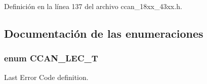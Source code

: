 Definición en la línea 137 del archivo ccan\+\_\+18xx\+\_\+43xx.\+h.



\subsection{Documentación de las enumeraciones}
\subsubsection[{\texorpdfstring{C\+C\+A\+N\+\_\+\+L\+E\+C\+\_\+T}{CCAN_LEC_T}}]{\setlength{\rightskip}{0pt plus 5cm}enum {\bf C\+C\+A\+N\+\_\+\+L\+E\+C\+\_\+T}}\hypertarget{group___c_c_a_n__18_x_x__43_x_x_gad7a3e9e736dfb04f5faff4954a01591a}{}\label{group___c_c_a_n__18_x_x__43_x_x_gad7a3e9e736dfb04f5faff4954a01591a}


Last Error Code definition. 

